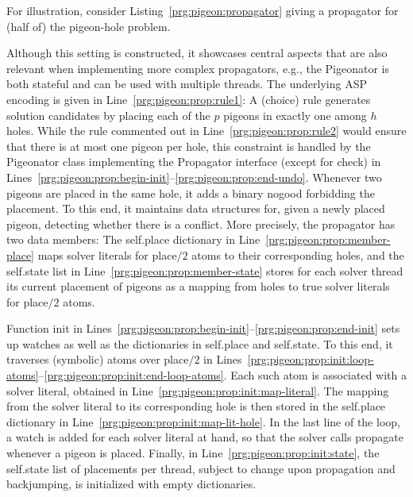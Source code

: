 \documentclass[a4paper,USenglish]{oasics-v2016}
\newcommand{\code}[1]{{\ttfamily #1}}
\newcommand{\codeClass}[2]{\code{#2}}
\begin{document}
For illustration,
consider Listing~\ref{prg:pigeon:propagator} giving a propagator for (half of) the pigeon-hole problem.
%

%
Although this setting is constructed, it showcases central aspects
that are also relevant when implementing more complex propagators,
e.g., the \code{Pigeonator} is both stateful and can be used with multiple threads.
%
The underlying ASP encoding is given in Line~\ref{prg:pigeon:prop:rule1}:
A (choice) rule generates solution candidates by placing each of the $p$ pigeons in exactly one among $h$ holes.
While the rule commented out in Line~\ref{prg:pigeon:prop:rule2} would ensure that there is at most one pigeon per hole,
this constraint is handled by the \code{Pigeonator} class
implementing the \code{Propagator} interface (except for \code{check}) in Lines~\ref{prg:pigeon:prop:begin-init}--\ref{prg:pigeon:prop:end-undo}.
Whenever two pigeons are placed in the same hole, it adds a binary nogood forbidding the placement.
To this end,
it maintains data structures for, given a newly placed pigeon,
detecting whether there is a conflict.
%
More precisely, the propagator has two data members:
The \code{self.place} dictionary in Line~\ref{prg:pigeon:prop:member-place} maps solver literals
for \code{place}$/2$ atoms to their corresponding holes,
and the \code{self.state} list in Line~\ref{prg:pigeon:prop:member-state} stores for each solver thread its current placement of pigeons
as a mapping from holes to true solver literals for \code{place}$/2$ atoms.

Function \codeClass{Pigeonator}{init} in Lines~\ref{prg:pigeon:prop:begin-init}--\ref{prg:pigeon:prop:end-init}
sets up watches as well as the dictionaries in \code{self.place} and \code{self.state}.
%
To this end,
it traverses (symbolic) atoms over \code{place}$/2$ in Lines~\ref{prg:pigeon:prop:init:loop-atoms}--\ref{prg:pigeon:prop:init:end-loop-atoms}.
Each such atom is associated with a solver literal, %
obtained in Line~\ref{prg:pigeon:prop:init:map-literal}.
The mapping from the solver literal to its corresponding hole is then stored in the \code{self.place} dictionary in
Line~\ref{prg:pigeon:prop:init:map-lit-hole}.
%
In the last line of the loop, a watch is added for each solver literal at hand,
so that the solver calls \code{propagate} whenever a pigeon is placed. %
%
Finally, in Line~\ref{prg:pigeon:prop:init:state}, the \code{self.state} list
of placements per thread,
subject to change upon propagation and backjumping,
%
is initialized with empty dictionaries.
\end{document}
